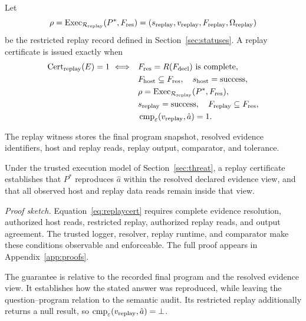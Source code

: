 Let
\[
\rho
=
\operatorname{Exec}_{\mathcal R_{\mathrm{replay}}}
(P^*,F_{\mathrm{res}})
=
(s_{\mathrm{replay}},
 v_{\mathrm{replay}},
 F_{\mathrm{replay}},
 \Omega_{\mathrm{replay}})
\]
be the restricted replay record defined in
Section~\ref{sec:statuses}. A replay certificate is issued exactly
when
\begin{equation}
\begin{aligned}
\operatorname{Cert}_{\mathrm{replay}}(E)=1
\ \Longleftrightarrow\quad
&F_{\mathrm{res}}=R(F_{\mathrm{decl}})
  \text{ is complete},\\
&F_{\mathrm{host}}\subseteq F_{\mathrm{res}},
  \quad s_{\mathrm{host}}=\mathrm{success},\\
&\rho=
  \operatorname{Exec}_{\mathcal R_{\mathrm{replay}}}
  (P^*,F_{\mathrm{res}}),\\
&s_{\mathrm{replay}}=\mathrm{success},
  \quad F_{\mathrm{replay}}\subseteq F_{\mathrm{res}},\\
&\operatorname{cmp}_{\varepsilon}
  (v_{\mathrm{replay}},\hat a)=1.
\end{aligned}
\label{eq:replaycert}
\end{equation}

The replay witness stores the final program snapshot, resolved
evidence identifiers, host and replay reads, replay output,
comparator, and tolerance.

\begin{theorem}
\label{thm:relative}
Under the trusted execution model of
Section~\ref{sec:threat}, a replay certificate establishes that
$P^*$ reproduces $\hat a$ within the resolved declared evidence
view, and that all observed host and replay data reads remain
inside that view.
\end{theorem}

\noindent\emph{Proof sketch.}
Equation~\ref{eq:replaycert} requires complete evidence resolution,
authorized host reads, restricted replay, authorized replay reads,
and output agreement. The trusted logger, resolver, replay runtime,
and comparator make these conditions observable and enforceable.
The full proof appears in Appendix~\ref{app:proofs}.

The guarantee is relative to the recorded final program and the
resolved evidence view. It establishes how the stated answer was
reproduced, while leaving the question--program relation to the
semantic audit. Its restricted replay additionally returns a null result, so
$\operatorname{cmp}_{\varepsilon}(v_{\mathrm{replay}},\hat a)=\bot$.

